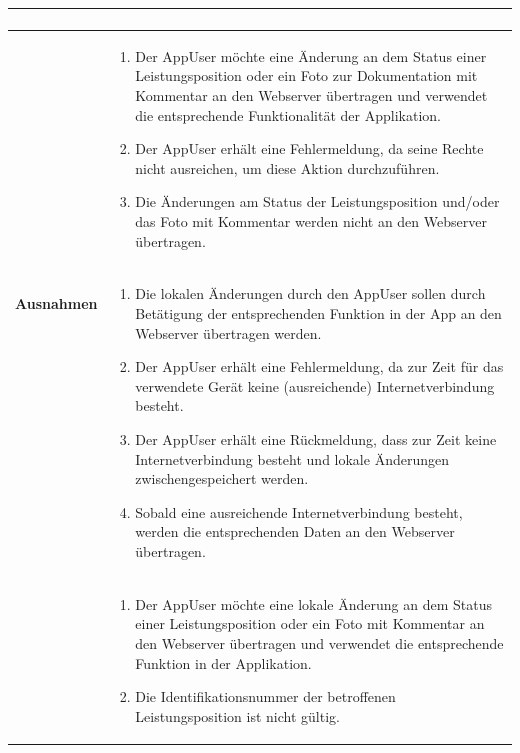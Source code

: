 \begin{longtable}[c]{|p{4cm}|p{10cm}|}
\begin{enumerate}
    \end{enumerate}                                                                                                                                                                                                                                                                                                                               \\ \hline
    \multirow{2}{*}{\textbf{Ausnahmen}} &
    \begin{enumerate}
        \item Der AppUser m\"ochte eine \"Anderung an dem Status einer Leistungsposition oder ein Foto zur Dokumentation mit Kommentar an den Webserver \"ubertragen und verwendet die entsprechende Funktionalit\"at der Applikation.
        \item Der AppUser erh\"alt eine Fehlermeldung, da seine Rechte nicht ausreichen, um diese Aktion durchzuf\"uhren.
        \item Die \"Anderungen am Status der Leistungsposition und/oder das Foto mit Kommentar werden nicht an den Webserver \"ubertragen.
    \end{enumerate}
    \\\cline{2-2}                 &
    \begin{enumerate}
        \item Die lokalen \"Anderungen durch den AppUser sollen durch Bet\"atigung der entsprechenden Funktion in der App an den Webserver \"ubertragen werden.
        \item Der AppUser erh\"alt eine Fehlermeldung, da zur Zeit f\"ur das verwendete Ger\"at keine (ausreichende) Internetverbindung besteht.
        \item Der AppUser erh\"alt eine R\"uckmeldung, dass zur Zeit keine Internetverbindung besteht und lokale \"Anderungen zwischengespeichert werden.
        \item Sobald eine ausreichende Internetverbindung besteht, werden die entsprechenden Daten an den Webserver \"ubertragen.
    \end{enumerate}
    \\\cline{2-2}                 &
    \begin{enumerate}
        \item Der AppUser m\"ochte eine lokale \"Anderung an dem Status einer Leistungsposition oder ein Foto mit Kommentar an den Webserver \"ubertragen und verwendet die entsprechende Funktion in der Applikation.
        \item Die Identifikationsnummer der betroffenen Leistungsposition ist nicht g\"ultig.

\end{enumerate}
\end{longtable}
